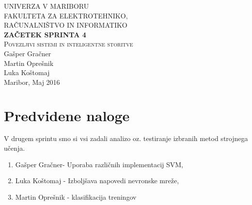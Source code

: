 \documentclass[a4paper,11pt]{article}
\begin{document}
\begin{titlepage}


\newcommand{\HRule}{\rule{\linewidth}{0.5mm}} %

\center %
 

\textsc{ UNIVERZA V MARIBORU\\ FAKULTETA ZA ELEKTROTEHNIKO,\\RAČUNALNIŠTVO IN INFORMATIKO}\\[5cm] %

{ \huge \bfseries \textbf{ZAČETEK SPRINTA 4}}\\[0.4cm] %
\textsc{\large Povezljivi sistemi in inteligentne storitve}\\[5cm] %

{\large Gašper Gračner}\\[0.4cm]
{\large Martin Oprešnik}\\[0.4cm]
{\large Luka Koštomaj}\\[0.4cm] 

\vfill %
{\large Maribor, Maj 2016}\\[3cm] %
\end{titlepage}
\newpage


\section{Predvidene naloge}
V drugem sprintu smo si vsi zadali analizo oz. testiranje izbranih metod strojnega učenja.
	\begin{enumerate}
		\item{Gašper Gračner- Uporaba različnih implementacij SVM,}
		\item{Luka Koštomaj - Izboljšava napovedi nevronske mreže,}
		\item{Martin Oprešnik - klasifikacija treningov}
	\end{enumerate}
	
\end{document}
